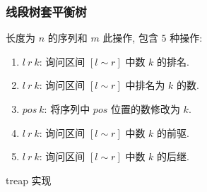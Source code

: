 \documentclass[UTF8, a4paper, titlepage, twoside]{ctexart}
\begin{document}
\subsubsection*{ 线段树套平衡树 }

长度为 $n$ 的序列和 $m$ 此操作, 包含 $5$ 种操作:
\begin{enumerate}
	\item $l \ r \ k$: 询问区间 $[l \sim r]$ 中数 $k$ 的排名.
	\item $l \ r \ k$: 询问区间 $[l \sim r]$ 中排名为 $k$ 的数.
	\item $pos \ k$: 将序列中 $pos$ 位置的数修改为 $k$.
	\item $l \ r \ k$: 询问区间 $[l \sim r]$ 中数 $k$ 的前驱.
	\item $l \ r \ k$: 询问区间 $[l \sim r]$ 中数 $k$ 的后继.
\end{enumerate}

treap 实现
\end{document}

